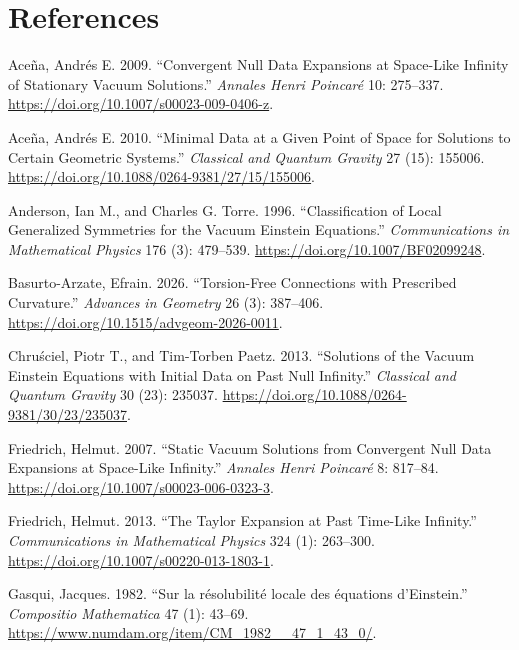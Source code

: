 \documentclass[
  english,
  11pt,
  reqno]{amsart}
\newlength{\cslhangindent}
\newenvironment{CSLReferences}[2] %
 {\begin{list}{}{%
  \setlength{\itemindent}{0pt}
  \setlength{\leftmargin}{0pt}
  \setlength{\parsep}{0pt}
  \ifodd #1
   \setlength{\leftmargin}{\cslhangindent}
   \setlength{\itemindent}{-1\cslhangindent}
  \fi
  \setlength{\itemsep}{#2\baselineskip}}}
 {\end{list}}
\begin{document}
\section*{References}

\protect{}\label{refs}
\begin{CSLReferences}{1}{1}
\sloppy
{}
Aceña, Andrés E. 2009. {``Convergent Null Data Expansions at Space-Like
Infinity of Stationary Vacuum Solutions.''} \emph{Annales Henri
Poincar{é}} 10: 275--337.
\url{https://doi.org/10.1007/s00023-009-0406-z}.

Aceña, Andrés E. 2010. {``Minimal Data at a Given Point of Space for
Solutions to Certain Geometric Systems.''} \emph{Classical and Quantum
Gravity} 27 (15): 155006.
\url{https://doi.org/10.1088/0264-9381/27/15/155006}.

Anderson, Ian M., and Charles G. Torre. 1996. {``Classification of Local
Generalized Symmetries for the Vacuum {Einstein} Equations.''}
\emph{Communications in Mathematical Physics} 176 (3): 479--539.
\url{https://doi.org/10.1007/BF02099248}.

Basurto-Arzate, Efrain. 2026. {``Torsion-Free Connections with
Prescribed Curvature.''} \emph{Advances in Geometry} 26 (3): 387--406.
\url{https://doi.org/10.1515/advgeom-2026-0011}.

Chruściel, Piotr T., and Tim-Torben Paetz. 2013. {``Solutions of the
Vacuum {Einstein} Equations with Initial Data on Past Null Infinity.''}
\emph{Classical and Quantum Gravity} 30 (23): 235037.
\url{https://doi.org/10.1088/0264-9381/30/23/235037}.

Friedrich, Helmut. 2007. {``Static Vacuum Solutions from Convergent Null
Data Expansions at Space-Like Infinity.''} \emph{Annales Henri
Poincar{é}} 8: 817--84. \url{https://doi.org/10.1007/s00023-006-0323-3}.

Friedrich, Helmut. 2013. {``The {Taylor} Expansion at Past Time-Like
Infinity.''} \emph{Communications in Mathematical Physics} 324 (1):
263--300. \url{https://doi.org/10.1007/s00220-013-1803-1}.

Gasqui, Jacques. 1982. {``Sur la r{é}solubilit{é} locale des {é}quations
d'{Einstein}.''} \emph{Compositio Mathematica} 47 (1): 43--69.
\url{https://www.numdam.org/item/CM_1982__47_1_43_0/}.


\end{CSLReferences}
\end{document}
